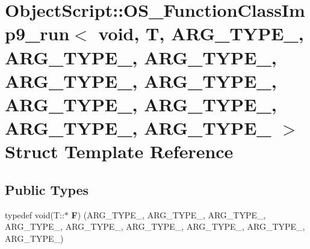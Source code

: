 \hypertarget{struct_object_script_1_1_o_s___function_class_imp9__run_3_01void_00_01_t_00_01_01_01_a_r_g___t_yef4b993113f2bc00e8c91b30946d2c3d}{}\section{Object\+Script\+:\+:O\+S\+\_\+\+Function\+Class\+Imp9\+\_\+run$<$ void, T, A\+R\+G\+\_\+\+T\+Y\+P\+E\+\_, A\+R\+G\+\_\+\+T\+Y\+P\+E\+\_, A\+R\+G\+\_\+\+T\+Y\+P\+E\+\_, A\+R\+G\+\_\+\+T\+Y\+P\+E\+\_, A\+R\+G\+\_\+\+T\+Y\+P\+E\+\_, A\+R\+G\+\_\+\+T\+Y\+P\+E\+\_, A\+R\+G\+\_\+\+T\+Y\+P\+E\+\_, A\+R\+G\+\_\+\+T\+Y\+P\+E\+\_, A\+R\+G\+\_\+\+T\+Y\+P\+E\+\_ $>$ Struct Template Reference}
\label{struct_object_script_1_1_o_s___function_class_imp9__run_3_01void_00_01_t_00_01_01_01_a_r_g___t_yef4b993113f2bc00e8c91b30946d2c3d}
\subsection*{Public Types}
\begin{DoxyCompactItemize}
\item 
typedef void(T\+::$\ast$ {\bfseries F}) (A\+R\+G\+\_\+\+T\+Y\+P\+E\+\_, A\+R\+G\+\_\+\+T\+Y\+P\+E\+\_, A\+R\+G\+\_\+\+T\+Y\+P\+E\+\_, A\+R\+G\+\_\+\+T\+Y\+P\+E\+\_, A\+R\+G\+\_\+\+T\+Y\+P\+E\+\_, A\+R\+G\+\_\+\+T\+Y\+P\+E\+\_, A\+R\+G\+\_\+\+T\+Y\+P\+E\+\_, A\+R\+G\+\_\+\+T\+Y\+P\+E\+\_, A\+R\+G\+\_\+\+T\+Y\+P\+E\+\_)\hypertarget{struct_object_script_1_1_o_s___function_class_imp9__run_3_01void_00_01_t_00_01_01_01_a_r_g___t_yef4b993113f2bc00e8c91b30946d2c3d_abc864a345aaa60ce6fa82b8dca775b71}{}\label{struct_object_script_1_1_o_s___function_class_imp9__run_3_01void_00_01_t_00_01_01_01_a_r_g___t_yef4b993113f2bc00e8c91b30946d2c3d_abc864a345aaa60ce6fa82b8dca775b71}

\end{DoxyCompactItemize}

